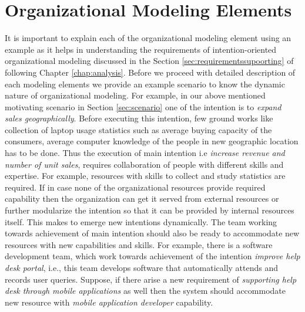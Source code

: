 \section{Organizational Modeling Elements}
\label{sec:entities}
It is important to explain each of the organizational modeling element using an example as it helps in understanding the requirements of intention-oriented organizational modeling discussed in the Section \ref{sec:requirementssupoorting} of following Chapter \ref{chap:analysis}. Before we proceed with detailed description of each modeling elements we provide an example scenario to know the dynamic nature of organizational modeling. For example, in our above mentioned motivating scenario in Section \ref{sec:scenario} one of the intention is to \textit{expand sales geographically}. Before executing this intention, few ground works like collection of laptop usage statistics such as average buying capacity of the consumers, average computer knowledge of the people in new geographic location has to be done. Thus the execution of main intention i.e \textit{increase revenue and number of unit sales}, requires collaboration of people with different skills and expertise. For example, resources with skills to collect and study statistics are required. If in case none of the organizational resources provide required capability then the organization can get it served from external resources or further modularize the intention so that it can be provided by internal resources itself. This makes to emerge new intentions dynamically. The team working towards achievement of main intention should also be ready to accommodate new resources with new capabilities and skills. For example, there is a software development team, which work towards achievement of the intention \textit{improve help desk portal}, i.e., this team develops software that automatically attends and records user queries. Suppose, if there arise a new requirement of \textit{supporting help desk through mobile applications} as well then the system should accommodate new resource with \textit{mobile application developer} capability. 

